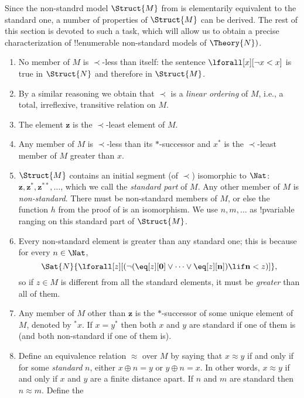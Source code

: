 \documentclass[../../include/open-logic-section]{subfiles}
\begin{document}
Since the non-standrd model $\Struct{M}$ from  is
elementarily equivalent to the standard one, a number of properties of
$\Struct{M}$ can be derived. The rest of this section is devoted to
such a task, which will allow us to obtain a precise characterization
of !!{enumerable} non-standard models of $\Theory{N})$.


\begin{enumerate}
\item No member of $M$ is $\prec$-less than itself: the sentence
  $\lforall[x][\lnot x < x]$ is true in $\Struct{N}$ and therefore in
  $\Struct{M}$.
\item By a similar reasoning we obtain that $\prec$ is a \emph{linear
    ordering} of $M$, i.e., a total, irreflexive, transitive relation
  on $M$. 
\item The element $\mathbf{z}$ is the $\prec$-least element of $M$.
\item Any member of $M$ is $\prec$-less than its $*$-successor and
  $x^*$ is the $\prec$-least member of $M$ greater than $x$.
\item $\Struct{M}$ contains an initial segment (of $\prec$)
  isomorphic to $\Nat$: $\mathbf{z}, \mathbf{z}^*,
  \mathbf{z}^{**}, \dots$, which we call the \emph{standard part} of
  $M$. Any other member of $M$ is \emph{non-standard}. There must be
  non-standard members of $M$, or else the function $h$ from
  the proof of  is an isomorphism.  We use
  $n, m, \dots$ as !p{variable} ranging on this standard part of
  $\Struct{M}$.
\item Every non-standard element is greater than any standard one;
  this is because for every $n \in \Nat$,
  \[
  \Sat{N}{\lforall[z][(\lnot(\eq[z][\mathbf{0}] \lor
  \dots \lor \eq[z][\mathbf{n}]) \lif \mathbf{n} < z)]},
  \]
  so if $z \in M$ is different from all the standard elements, it must
  be \emph{greater} than all of them. 
\item Any member of $M$ other than $\mathbf{z}$ is the $*$-successor
  of some unique element of $M$, denoted by $^*x$. If $x = y^*$ then
  both $x$ and $y$ are standard if one of them is (and both
  non-standard if one of them is).
\item Define an equivalence relation $\approx$ over $M$ by saying
  that $x \approx y$ if and only if for some \emph{standard} $n$,
  either $x \oplus n = y$ or $y \oplus n =x$. In other words, $x
  \approx y$ if and only if $x$ and $y$ are a finite distance
  apart. If $n$ and $m$ are standard then $n \approx m$. Define the

\end{enumerate}
\end{document}
